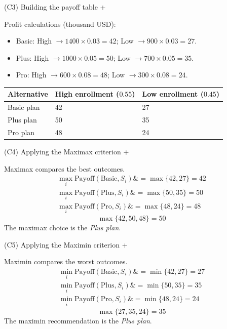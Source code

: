 \documentclass[11pt]{article}
\begin{document}
	
	
	
	
	
	(C3) Building the payoff table
	+
	
	
	Profit calculations (thousand USD):
	\begin{itemize}
		\item Basic: High $\to 1400 \times 0.03 = 42$; Low $\to 900 \times 0.03 = 27$.
		\item Plus: High $\to 1000 \times 0.05 = 50$; Low $\to 700 \times 0.05 = 35$.
		\item Pro: High $\to 600 \times 0.08 = 48$; Low $\to 300 \times 0.08 = 24$.
	\end{itemize}
	
	\begin{center}
		\begin{tabular}{lll}
			\toprule
			Alternative & High enrollment
			($0.55$) & Low enrollment
			($0.45$) \\
			\midrule
			Basic plan & 42 & 27 \\
			Plus plan & 50 & 35 \\
			Pro plan & 48 & 24 \\
			\bottomrule
		\end{tabular}
	\end{center}
	
	
	
	
	
	
	(C4) Applying the Maximax criterion
	+
	
	
	Maximax compares the best outcomes.
	\[
	\begin{aligned}
		\max_i \text{Payoff}(\text{Basic}, S_i) \&= \max\{42, 27\} = 42 \\
		\max_i \text{Payoff}(\text{Plus}, S_i) \&= \max\{50, 35\} = 50 \\
		\max_i \text{Payoff}(\text{Pro}, S_i) \&= \max\{48, 24\} = 48
	\end{aligned}
	\]
	\[
	\max\{42, 50, 48\} = 50
	\]
	The maximax choice is the \emph{Plus plan}.
	
	
	
	
	
	(C5) Applying the Maximin criterion
	+
	
	
	Maximin compares the worst outcomes.
	\[
	\begin{aligned}
		\min_i \text{Payoff}(\text{Basic}, S_i) \&= \min\{42, 27\} = 27 \\
		\min_i \text{Payoff}(\text{Plus}, S_i) \&= \min\{50, 35\} = 35 \\
		\min_i \text{Payoff}(\text{Pro}, S_i) \&= \min\{48, 24\} = 24
	\end{aligned}
	\]
	\[
	\max\{27, 35, 24\} = 35
	\]
	The maximin recommendation is the \emph{Plus plan}.
	
\end{document}
